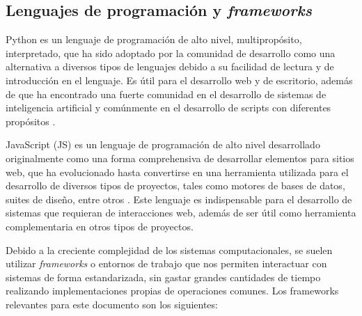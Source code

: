 \subsection{Lenguajes de programación y \textit{frameworks}}

Python es un lenguaje de programación de alto nivel, multipropósito, interpretado, que ha sido adoptado por la comunidad de desarrollo como una alternativa a diversos tipos de lenguajes debido a su facilidad de lectura y de introducción en el lenguaje. Es útil para el desarrollo web y de escritorio, además de que ha encontrado una fuerte comunidad en el desarrollo de sistemas de inteligencia artificial y comúnmente en el desarrollo de scripts con diferentes propósitos \cite{codecademy-python}.

JavaScript (JS) es un lenguaje de programación de alto nivel desarrollado originalmente como una forma comprehensiva de desarrollar elementos para sitios web, que ha evolucionado hasta convertirse en una herramienta utilizada para el desarrollo de diversos tipos de proyectos, tales como motores de bases de datos, suites de diseño, entre otros \cite{mozilla_javascript}. Este lenguaje es indispensable para el desarrollo de sistemas que requieran de interacciones web, además de ser útil como herramienta complementaria en otros tipos de proyectos.

Debido a la creciente complejidad de los sistemas computacionales, se suelen utilizar \textit{frameworks} o entornos de trabajo que nos permiten interactuar con sistemas de forma estandarizada, sin gastar grandes cantidades de tiempo realizando implementaciones propias de operaciones comunes. Los frameworks relevantes para este documento son los siguientes:

